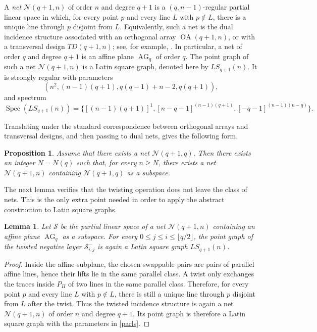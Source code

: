 \documentclass[reqno,a4paper,11pt]{article}
\newtheorem{lem}[thm]{Lemma}
\newtheorem{pro}[thm]{Proposition}
\theoremstyle{definition}
\theoremstyle{remark}
\DeclareMathOperator{\Spec}{Spec}
\newcommand{\OA}{\operatorname{OA}}
\newcommand{\AG}{\operatorname{AG}}
\begin{document}
A \emph{net} $\mathcal{N}(q+1,n)$ of order $n$ and degree $q+1$  is a $(q,n-1)$-regular partial linear space in which, for every
point $p$ and every line $L$ with $p\notin L$, there is a unique line
through $p$ disjoint from $L$.
Equivalently, such a net is the dual incidence structure associated
with an orthogonal array $\OA(q+1,n)$, or with a transversal design
$TD(q+1,n)$; see, for example,
\cite[Chapter~X]{BJL1999}.
In particular, a net of order \(q\) and degree \(q+1\) is an affine plane
\(\AG_q\) of order \(q\). 
The point graph of such a net $\mathcal{N}(q+1,n)$ is a Latin square graph, denoted here by
\(LS_{q+1}(n)\).
It is strongly regular with parameters
\begin{equation}\label{parls}
(n^2,(n-1)(q+1),q(q-1)+n-2,q(q+1)),
\end{equation}
and spectrum
\begin{equation}\label{specls}
\Spec(LS_{q+1}(n))=
\{[(n-1)(q+1)]^1,[n-q-1]^{(n-1)(q+1)},[-q-1]^{(n-1)(n-q)}\}.
\end{equation}

Translating \cite[Theorem~1.4]{BKOT2019} under the standard
correspondence between orthogonal arrays and transversal designs, and
then passing to dual nets, gives the following form.

\begin{pro}\label{prop oa}
	Assume that there exists a net $\mathcal{N}(q+1,q)$.
	Then there exists an integer $N=N(q)$ such that, for every $n\ge N$,
	there exists a net $\mathcal{N}(q+1,n)$ containing $\mathcal{N}(q+1,q)$
	as a subspace.
\end{pro}

The next lemma verifies that the twisting operation does not leave the
class of nets.  This is the only extra point needed in order to apply the
abstract construction to Latin square graphs.

\begin{lem}\label{lem:latin-negative-layer}
Let $\mathcal S$ be the partial linear space of a net $\mathcal{N}(q+1,n)$ containing an affine plane $\AG_q$ as a subspace.
For every $0\le j\le i\le \lfloor q/2\rfloor$, the point graph of the twisted negative layer $\mathcal S^-_{i,j}$ is again a Latin square graph  $LS_{q+1}(n)$.
\end{lem}

\begin{proof}
Inside the affine subplane, the chosen swappable pairs are pairs of parallel affine lines, hence their lifts lie in the same parallel class.
A twist only exchanges the traces inside $P_\Pi$ of two lines in the same parallel class.
Therefore, for every point \(p\) and every line \(L\) with \(p\notin L\),
there is still a unique line through \(p\) disjoint from \(L\) after the twist.
Thus the twisted incidence structure is again a net $\mathcal{N}(q+1,n)$ of order $n$ and degree $q+1$.
Its point graph is therefore a Latin square graph with the parameters in \eqref{parls}.
\end{proof}
\end{document}
